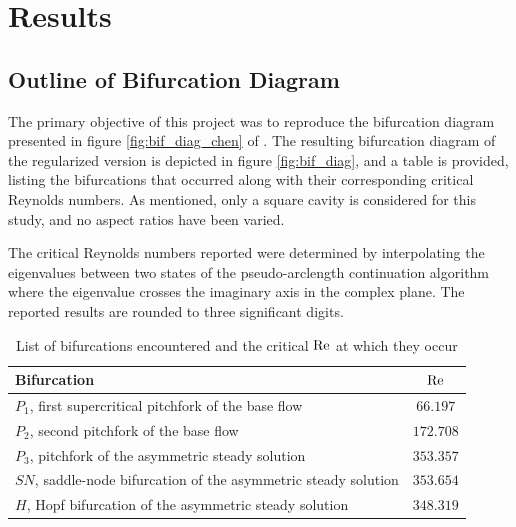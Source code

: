 
\section{Results } \label{sec:res}

\subsection{Outline of Bifurcation Diagram}

The primary objective of this project was to reproduce the bifurcation diagram
presented in figure \ref{fig:bif_diag_chen} of \citet{chen2013}. The resulting
bifurcation diagram of the regularized version is depicted in figure
\ref{fig:bif_diag}, and a table is provided, listing the bifurcations that
occurred along with their corresponding critical Reynolds numbers. As
mentioned, only a square cavity is considered for this study, and no aspect
ratios have been varied.

The critical Reynolds numbers reported were determined by 
interpolating the eigenvalues between two states of the pseudo-arclength
continuation algorithm where the eigenvalue crosses the imaginary axis in the
complex plane. The reported results are rounded to three significant digits.

\begin{table}[h!]
  \centering
  \caption{List of bifurcations encountered and the critical $\mathrm{Re}$ at which they
    occur}
  \label{tab:bif_points}
\begin{tabular}{l c}
Bifurcation & $\mathrm{Re}$\\
\hline
$P_1$, first supercritical pitchfork of the base flow & $66.197$ \\
$P_2$, second pitchfork of the base flow & $172.708$ \\
$P_3$, pitchfork of the asymmetric steady solution & $353.357$ \\
$SN$, saddle-node bifurcation of the asymmetric steady solution & $353.654$ \\
$H$, Hopf bifurcation of the asymmetric steady solution & $348.319$ \\
\end{tabular}
\end{table}

